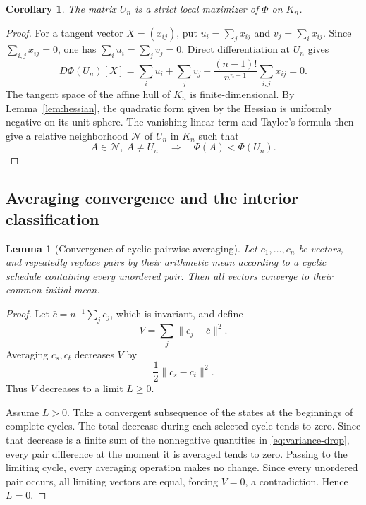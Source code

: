 \documentclass[11pt,a4paper]{article}
\numberwithin{equation}{section}
\newtheorem{lemma}[theorem]{Lemma}
\newtheorem{corollary}[theorem]{Corollary}
\theoremstyle{definition}
\newcommand{\1}{\mathbf{1}}
\begin{document}
\begin{corollary}\label{cor:strict-local}
The matrix $U_n$ is a strict local maximizer of $\Phi$ on $K_n$.
\end{corollary}

\begin{proof}
For a tangent vector $X=(x_{ij})$, put
$u_i=\sum_jx_{ij}$ and $v_j=\sum_ix_{ij}$.  Since
$\sum_{i,j}x_{ij}=0$, one has
$\sum_i u_i=\sum_jv_j=0$.  Direct differentiation at $U_n$ gives
\[
 D\Phi(U_n)[X]
 =\sum_i u_i+\sum_jv_j
 -\frac{(n-1)!}{n^{n-1}}\sum_{i,j}x_{ij}=0.
\]
The tangent space of the affine hull of $K_n$ is finite-dimensional.  By
Lemma~\ref{lem:hessian}, the quadratic form given by the Hessian is uniformly
negative on its unit sphere.  The vanishing linear term and Taylor's formula
then give a relative neighborhood $\mathcal N$ of $U_n$ in $K_n$ such that
\[
 A\in\mathcal N,\ A\ne U_n
 \quad\Longrightarrow\quad
 \Phi(A)<\Phi(U_n).
\]
\end{proof}

\subsection{Averaging convergence and the interior classification}

\begin{lemma}[Convergence of cyclic pairwise averaging]\label{lem:averaging-convergence}
Let $c_1,\dots,c_n$ be vectors, and repeatedly replace pairs by their arithmetic mean according to a cyclic schedule containing every unordered pair.  Then all vectors converge to their common initial mean.
\end{lemma}

\begin{proof}
Let $\bar c=n^{-1}\sum_jc_j$, which is invariant, and define
\[
 V=\sum_j\|c_j-\bar c\|^2.
\]
Averaging $c_s,c_t$ decreases $V$ by
\begin{equation}\label{eq:variance-drop}
 \frac12\|c_s-c_t\|^2.
\end{equation}
Thus $V$ decreases to a limit $L\ge0$.

Assume $L>0$.  Take a convergent subsequence of the states at the beginnings of complete cycles.  The total decrease during each selected cycle tends to zero.  Since that decrease is a finite sum of the nonnegative quantities in \eqref{eq:variance-drop}, every pair difference at the moment it is averaged tends to zero.  Passing to the limiting cycle, every averaging operation makes no change.  Since every unordered pair occurs, all limiting vectors are equal, forcing $V=0$, a contradiction.  Hence $L=0$.
\end{proof}
\end{document}

